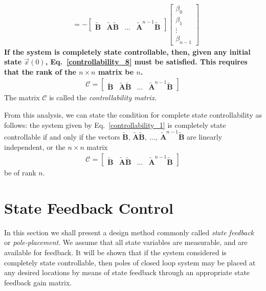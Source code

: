 \documentclass[12pt,a4paper,oneside]{book}
\begin{document}
\begin{onehalfspace}
\begin{equation}
\begin{aligned}
		 \\[6pt]
		&=-\begin{bmatrix} 
		\tilde{\mathbf{B}}&\tilde{\mathbf{A}}\tilde{\mathbf{B}}& ... 
		&\tilde{\mathbf{A}}^{n-1}\tilde{\mathbf{B}}\end{bmatrix}\begin{bmatrix} 
		\beta_0\\[6pt] 
		\beta_1\\[6pt] \vdots \\[6pt] \beta_{n-1}\end{bmatrix}
	\end{aligned}
\end{equation}
\textbf{If the system is completely state controllable, then, given any initial 
state $\vec{x}(0)$, Eq.~\eqref{controllability_8} must be satisfied. This 
requires that the rank of the $n\times n$ matrix be $n$.}
\begin{equation}\label{controllability_9}
	\begin{aligned}
		\mathcal{C}=\begin{bmatrix} \tilde{\mathbf{B}}&\tilde{\mathbf{A}} 
		\tilde{\mathbf{B}}& ... 
			&\tilde{\mathbf{A}}^{n-1}\tilde{\mathbf{B}}\end{bmatrix}
	\end{aligned}
\end{equation}
The matrix $\mathcal{C}$ is called the \textit{controllability matrix}.

From this analysis, we can state the condition for complete state 
controllability as follows: the system given by Eq.~\eqref{controllability_1} 
is completely state controllable if and only if the vectors 
$\tilde{\mathbf{B}}$, $\tilde{\mathbf{A}}\tilde{\mathbf{B}},\ ...,\ 
\tilde{\mathbf{A}}^{n-1}\tilde{\mathbf{B}}$ are linearly 
independent, or the $n\times n$ matrix 
\begin{equation*}
	\begin{aligned}
		\mathcal{C}=\begin{bmatrix} \tilde{\mathbf{B}}&\tilde{\mathbf{A}} 
		\tilde{\mathbf{B}}& ... 
			&\tilde{\mathbf{A}}^{n-1}\tilde{\mathbf{B}}\end{bmatrix}
	\end{aligned}
\end{equation*}
be of rank $n$.

\section{State Feedback Control}
In this section we shall present a design method commonly called \textit{state feedback} or \textit{pole-placement}. We assume that all state variables are measurable, and are available for feedback. It will be shown that if the system considered is completely state controllable, then poles of closed loop system may be placed at any desired locations by means of state feedback through an appropriate state feedback gain matrix.


\end{onehalfspace}
\end{document}
